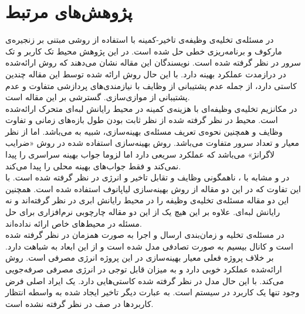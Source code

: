 \section{پژوهش‌های مرتبط}
در \Cite{Liu} مسئله‌ی تخلیه‌ی وظیفه‌ی تاخیر-کمینه با استفاده از روشی مبتنی بر زنجیره‌ی مارکوف و برنامه‌ریزی خطی حل شده است. در این پژوهش محیط تک کاربر و تک سرور در نظر گرفته شده است. نویسندگان این مقاله نشان می‌دهند که روش ارائه‌شده در درازمدت عملکرد بهینه دارد. با این حال روش ارائه شده توسط این مقاله چندین کاستی دارد، از جمله عدم پشتیبانی از وظایف با نیازمندی‌های پردازشی متفاوت و عدم پشتیبانی از موازی‌سازی. \CurrentProject گسترشی بر این مقاله است. \\

در \Cite{samanta} مکانزیم تخلیه‌ی وظیفه‌ای با هزینه‌ی کمینه در محیط رایانش لبه‌ای متحرک ارائه‌شده است. محیط در نظر گرفته شده از نظر ثابت بودن طول بازه‌های زمانی و تفاوت وظایف و همچنین نحوه‌ی تعریف مسئله‌ی بهینه‌سازی، شبیه به \CurrentProject می‌باشد. اما از نظر معیار و تعداد سرور متفاوت می‌باشد. روش بهینه‌سازی استفاده شده در \CurrentProject روش «ضرایب لاگرانژ» می‌باشد که عملکرد سریعی دارد اما لزوما جواب بهینه سراسری را پیدا نمی‌کند و فقط جواب‌های بهینه محلی را پیدا می‌کند. \\

در \Cite{kwak} و \Cite{jiang} مشابه با \CurrentProject، ناهمگونی وظایف و تقابل تاخیر و انرژی در نظر گرفته شده است. با این تفاوت که در این دو مقاله از روش بهینه‌سازی لیاپانوف استفاده شده است. همچنین این دو مقاله مسئله‌ی تخلیه‌ی وظیفه را در محیط رایانش ابری در نظر گرفته‌اند و نه رایانش لبه‌ای. علاوه بر این هیچ یک از این دو مقاله چارچوبی نرم‌افزاری برای حل مسئله در محیط‌های خاص ارائه نداده‌اند. \\

در \Cite{zhang2013} مسئله‌ی تخلیه و زمان‌بندی ارسال و اجرا به صورت همزمان در نظر گرفته شده است و کانال بیسیم به صورت تصادفی مدل شده است و از این ابعاد به \CurrentProject شباهت دارد. بر خلاف پروژه فعلی معیار بهینه‌سازی در این پروژه انرژی مصرفی است. روش ارائه‌شده عملکرد خوبی دارد و به میزان قابل توجی در انرژی مصرفی صرفه‌جویی می‌کند. با این حال مدل در نظر گرفته شده کاستی‌هایی دارد. یک ایراد اصلی فرض وجود تنها یک کاربرد در سیستم است. به عبارت دیگر تاخیر ایجاد شده به واسطه انتظار کاربردها در صف در نظر گرفته نشده است.

\clearpage

